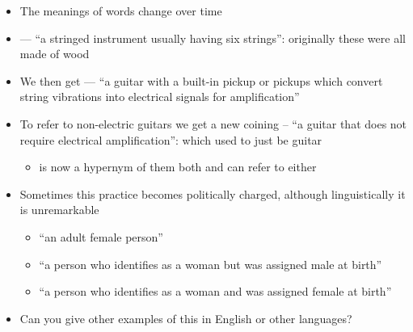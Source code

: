 \documentclass[a4paper,landscape,headrule,footrule,xetex]{foils}
\begin{document}
\begin{itemize}\addtolength{\itemsep}{-1ex}
\item The meanings of words change over time
\item {} --- ``a stringed instrument usually having six
  strings'': originally these were all made of wood
\item We then get  --- ``a guitar with a built-in
  pickup or pickups which convert string vibrations into electrical
  signals for amplification''
\item To refer to non-electric guitars we get a new coining
   -- ``a guitar that does not require electrical
  amplification'': which used to just be guitar
  \begin{itemize}
  \item {} is now a hypernym of them both and can refer to
    either
  \end{itemize}
\newpage
  
\item Sometimes this practice becomes politically charged, although
  linguistically it is unremarkable
  \begin{itemize}
  \item {} ``an adult female person''
  \item {} ``a person who identifies as a woman but was assigned male at birth''
  \item {}  ``a person who identifies as a woman and was assigned female at birth''
  \end{itemize}
  \item Can you give other examples of this in English or other languages?\task  
  
\end{itemize}

% 

\end{document}
